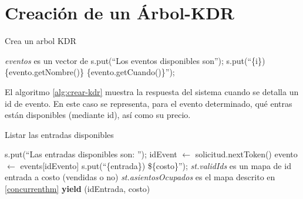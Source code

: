 \section{Creación de un Árbol-KDR}

\begin{algorithm}
\caption{Crea un arbol KDR}
\label{alg:crear-kdr}
\begin{algorithmic}[1]
	\Require \emph{eventos} es un vector de 
\State s.put(``Los eventos disponibles son'');
	\State s.put(``\{i\}) \{evento.getNombre()\} \{evento.getCuando()\}'');
\EndFor
\EndProcedure
\end{algorithmic}
\end{algorithm}

El algoritmo \ref{alg:crear-kdr} muestra la respuesta del sistema cuando se detalla un id de evento.
En este caso se representa, para el evento determinado, qué entras están disponibles (mediante id),
	así como su precio.



	\begin{algorithm}
		\caption{Listar las entradas disponibles}
		\label{alg:listar-entradas}
		\begin{algorithmic}[1]
			\State s.put(``Las entradas disponibles son: '');
			\State idEvent $\gets$ solicitud.nextToken()
			\State evento $\gets$ events[idEvento]
				\State s.put(``\{entrada\}) \$\{costo\}'');
			\EndFor
		\EndProcedure
		\Statex
		\Require \emph{st.validIds} es un mapa de id entrada a costo (vendidas o no)
		\Require \emph{st.asientosOcupados} es el mapa descrito en \ref{concurrenthm}
				\State \textbf{yield} (idEntrada, costo)
			\EndIf
			\EndFor
		\EndProcedure
		\end{algorithmic}
		\end{algorithm}